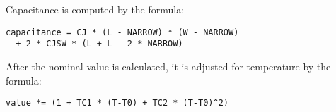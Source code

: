 Capacitance is computed by the formula:

\begin{verbatim}
capacitance = CJ * (L - NARROW) * (W - NARROW)
  + 2 * CJSW * (L + L - 2 * NARROW)
\end{verbatim}

After the nominal value is calculated, it is adjusted for temperature
by the formula:

\begin{verbatim}
value *= (1 + TC1 * (T-T0) + TC2 * (T-T0)^2)
\end{verbatim}
